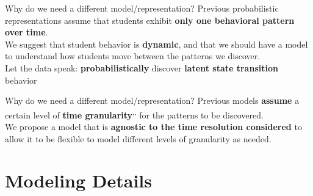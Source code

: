 \documentclass[10pt]{beamer}
\begin{document}
\begin{frame}{Why do we need a different model/representation?}
  Previous probabilistic representations
  assume that students exhibit \textbf{only one behavioral pattern over
  time}.
  \\[\baselineskip]
  We suggest that student behavior is \textbf{dynamic}, and that we should
  have a model to understand how students move between the patterns we
  discover.
  \\[\baselineskip]
  Let the data speak: \textbf{probabilistically} discover \textbf{latent
  state transition} behavior
\end{frame}

\begin{frame}{Why do we need a different model/representation?}
  Previous models \textbf{assume} a certain level of \textbf{time
  granularity}\textsuperscript{,}\textsuperscript{,}
  for the patterns to be discovered.
  \\[\baselineskip]
  We propose a model that is \textbf{agnostic to the time resolution
  considered} to allow it to be flexible to model different levels of
  granularity as needed.
\end{frame}

\section{Modeling Details}
\end{document}
